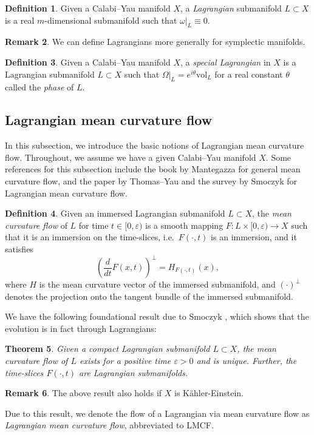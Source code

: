 \documentclass[10pt, a4paper]{article}
\theoremstyle{plain}%
\newtheorem{theorem}{Theorem}[section]
\theoremstyle{definition}
\newtheorem{defn}[theorem]{Definition}
\newtheorem{rem}[theorem]{Remark}
\numberwithin{figure}{section}
\numberwithin{equation}{section}
\newcommand{\rt}{\rightarrow}
\newcommand{\ep}{\varepsilon}
\begin{document}
\begin{defn}
	Given a Calabi--Yau manifold $X$, 
	a \textit{Lagrangian} submanifold $L\subset X$ is a real $m$-dimensional submanifold such that $\omega|_{L}\equiv 0$. 
\end{defn}
\begin{rem}
	We can define Lagrangians more generally for symplectic manifolds.
\end{rem}
\begin{defn}
	Given a Calabi--Yau manifold $X$, a \textit{special Lagrangian} in $X$ is a Lagrangian submanifold $L\subset X$ such that $\Omega|_{L} = e^{i\theta}\textrm{vol}_L$ for a real constant $\theta$ called the \textit{phase} of $L$.
\end{defn}
 




\subsection{Lagrangian mean curvature flow}
In this subsection, we introduce the basic notions of Lagrangian mean curvature flow. Throughout, we assume we have a given Calabi--Yau manifold $X$. Some references for this subsection include the book by Mantegazza \cite{Man11} for general mean curvature flow, and the paper by Thomas--Yau \cite{TY02} and the survey by Smoczyk \cite{Smo12} for Lagrangian mean curvature flow.

\begin{defn}
	Given an immersed Lagrangian submanifold $L\subset X$, the \textit{mean curvature flow} of $L$ for time $t\in[0,\ep)$ is a smooth mapping $F: L\times [0,\varepsilon) \rt X $ such that it is an immersion on the time-slices, i.e.\ $F(\cdot,t)$ is an immersion,  and it satisfies \[
	\left(\frac{d}{dt}F(x,t)\right)^\perp = H_{F(\cdot,t)}(x),
	\]
	where $H$ is the mean curvature vector of the immersed submanifold, and $(\cdot)^\perp$ denotes the projection onto the tangent bundle of the immersed submanifold.
\end{defn} 

We have the following foundational result due to Smoczyk \cite{Smo96}, which shows that the evolution is in fact through Lagrangians:
\begin{theorem}
	Given a compact Lagrangian submanifold $L\subset X$, the mean curvature flow of $L$ exists for a positive time $\varepsilon>0$ and is unique. Further, the time-slices $F(\cdot,t)$ are Lagrangian submanifolds.
\end{theorem}
\begin{rem}
	The above result also holds if $X$ is K\"{a}hler-Einstein.
\end{rem}
Due to this result, we denote the flow of a Lagrangian via mean curvature flow as \textit{Lagrangian mean curvature flow}, abbreviated to LMCF.
\end{document}
